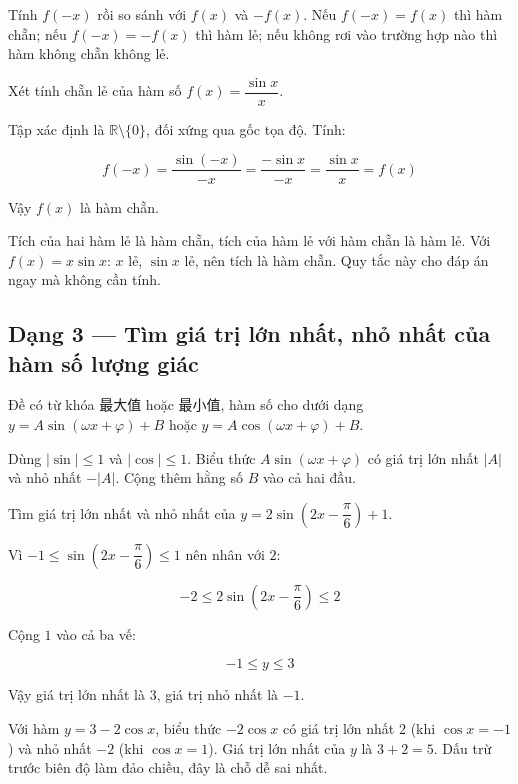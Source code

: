 \documentclass[11pt, a4paper]{article}
\begin{document}
 Tính $f(-x)$ rồi so sánh với $f(x)$ và $-f(x)$. Nếu $f(-x) = f(x)$ thì hàm chẵn; nếu $f(-x) = -f(x)$ thì hàm lẻ; nếu không rơi vào trường hợp nào thì hàm không chẵn không lẻ.

\begin{vidu}[{2}]
Xét tính chẵn lẻ của hàm số $f(x) = \dfrac{\sin x}{x}$.

Tập xác định là $\mathbb{R} \setminus \{0\}$, đối xứng qua gốc tọa độ. Tính:

$$f(-x) = \frac{\sin(-x)}{-x} = \frac{-\sin x}{-x} = \frac{\sin x}{x} = f(x)$$

Vậy $f(x)$ là hàm chẵn.

 Tích của hai hàm lẻ là hàm chẵn, tích của hàm lẻ với hàm chẵn là hàm lẻ. Với $f(x) = x\sin x$: $x$ lẻ, $\sin x$ lẻ, nên tích là hàm chẵn. Quy tắc này cho đáp án ngay mà không cần tính.

\end{vidu}
\subsection{Dạng 3 — Tìm giá trị lớn nhất, nhỏ nhất của hàm số lượng giác}

 Đề có từ khóa 最大值 hoặc 最小值, hàm số cho dưới dạng $y = A\sin(\omega x + \varphi) + B$ hoặc $y = A\cos(\omega x + \varphi) + B$.

 Dùng $|\sin| \le 1$ và $|\cos| \le 1$. Biểu thức $A\sin(\omega x + \varphi)$ có giá trị lớn nhất $|A|$ và nhỏ nhất $-|A|$. Cộng thêm hằng số $B$ vào cả hai đầu.

\begin{vidu}[{3}]
Tìm giá trị lớn nhất và nhỏ nhất của $y = 2\sin\left(2x - \dfrac{\pi}{6}\right) + 1$.

Vì $-1 \le \sin\left(2x - \dfrac{\pi}{6}\right) \le 1$ nên nhân với $2$:

$$-2 \le 2\sin\left(2x - \frac{\pi}{6}\right) \le 2$$

Cộng $1$ vào cả ba vế:

$$-1 \le y \le 3$$

Vậy giá trị lớn nhất là $3$, giá trị nhỏ nhất là $-1$.

 Với hàm $y = 3 - 2\cos x$, biểu thức $-2\cos x$ có giá trị lớn nhất $2$ (khi $\cos x = -1$) và nhỏ nhất $-2$ (khi $\cos x = 1$). Giá trị lớn nhất của $y$ là $3 + 2 = 5$. Dấu trừ trước biên độ làm đảo chiều, đây là chỗ dễ sai nhất.

\end{vidu}
\end{document}
